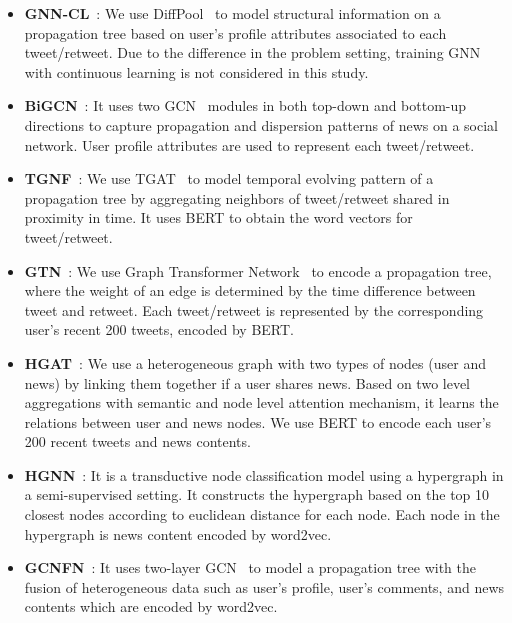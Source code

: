 \documentclass[conference]{IEEEtran}
\begin{document}
\begin{itemize}
     \item \textbf{GNN-CL}~\cite{han2020graph}: We use DiffPool~\cite{ying2018hierarchical} to model structural information on a propagation tree based on user's profile attributes associated to each tweet/retweet. Due to the difference in the problem setting, training GNN with continuous learning is not considered in this study. 
    


     \item \textbf{BiGCN}~\cite{bian2020rumor}: It uses two GCN~\cite{kipf2016semi} modules in both top-down and bottom-up directions to capture propagation and dispersion patterns of news on a social network. User profile attributes are used to represent each tweet/retweet.
         
    \item \textbf{TGNF}~\cite{song2021temporally}: We use TGAT~\cite{xu2020inductive} to model temporal evolving pattern of a propagation tree by aggregating neighbors of tweet/retweet shared in proximity in time. It uses BERT to obtain the word vectors for tweet/retweet.

    \item \textbf{GTN}~\cite{matsumoto2021propagation}: We use Graph Transformer Network~\cite{shi2020masked} to encode a propagation tree, where the weight of an edge is determined by the time difference between tweet and retweet. Each tweet/retweet is represented by the corresponding user's recent 200 tweets, encoded by BERT.


             
     \item \textbf{HGAT}~\cite{ren2021fake}: We use a heterogeneous graph with two types of nodes (user and news) by linking them together if a user shares news. Based on two level aggregations with semantic and node level attention mechanism, it learns the relations between user and news nodes. We use BERT to encode each user's 200 recent tweets and news contents.
     
     \item \textbf{HGNN}~\cite{feng2019hypergraph}: It is a transductive node classification model using a hypergraph in a semi-supervised setting. It constructs the hypergraph based on the top 10 closest nodes according to euclidean distance for each node. Each node in the hypergraph is news content encoded by word2vec.
     
     \item \textbf{GCNFN}~\cite{monti2019fake}: It uses two-layer GCN~\cite{kipf2016semi} to model a propagation tree with the fusion of heterogeneous data such as user's profile, user's comments, and news contents which are encoded by word2vec.
     

\end{itemize}
\end{document}
